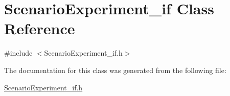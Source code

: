 \hypertarget{class_scenario_experiment__if}{}\section{Scenario\+Experiment\+\_\+if Class Reference}
\label{class_scenario_experiment__if}


{\ttfamily \#include $<$Scenario\+Experiment\+\_\+if.\+h$>$}



The documentation for this class was generated from the following file\+:\begin{DoxyCompactItemize}
\item 
\hyperlink{_scenario_experiment__if_8h}{Scenario\+Experiment\+\_\+if.\+h}\end{DoxyCompactItemize}
